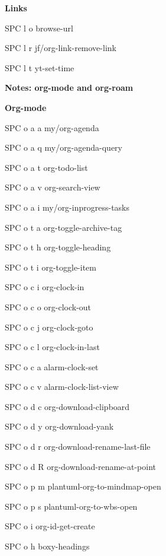\documentclass[10pt]{article}
\renewcommand\subsection[1]{\smallskip\par\textbf{\color{heading}#1}}
\renewcommand\subsubsection[1]{\smallskip\par\textbf{\color{heading}\small#1}}
\begin{document}
\begin{multicols}{4}
  \subsubsection{Links}
  \begin{keylist}
    \item[SPC l o] browse-url
    \item[SPC l r] jf/org-link-remove-link
    \item[SPC l t] yt-set-time
  \end{keylist}
  \subsection{Notes: org-mode and org-roam}
  \subsubsection{Org-mode}
  \begin{keylist}
    \item[SPC o a a] my/org-agenda
    \item[SPC o a q] my/org-agenda-query
    \item[SPC o a t] org-todo-list
    \item[SPC o a v] org-search-view
    \item[SPC o a i] my/org-inprogress-tasks
    \item[SPC o t a] org-toggle-archive-tag
    \item[SPC o t h] org-toggle-heading
    \item[SPC o t i] org-toggle-item
    \item[SPC o c i] org-clock-in
    \item[SPC o c o] org-clock-out
    \item[SPC o c j] org-clock-goto
    \item[SPC o c l] org-clock-in-last
    \item[SPC o c a] alarm-clock-set
    \item[SPC o c v] alarm-clock-list-view
    \item[SPC o d c] org-download-clipboard
    \item[SPC o d y] org-download-yank
    \item[SPC o d r] org-download-rename-last-file
    \item[SPC o d R] org-download-rename-at-point
    \item[SPC o p m] plantuml-org-to-mindmap-open
    \item[SPC o p s] plantuml-org-to-wbs-open
    \item[SPC o i] org-id-get-create
    \item[SPC o h] boxy-headings
  \end{keylist}

\end{multicols}
\end{document}
